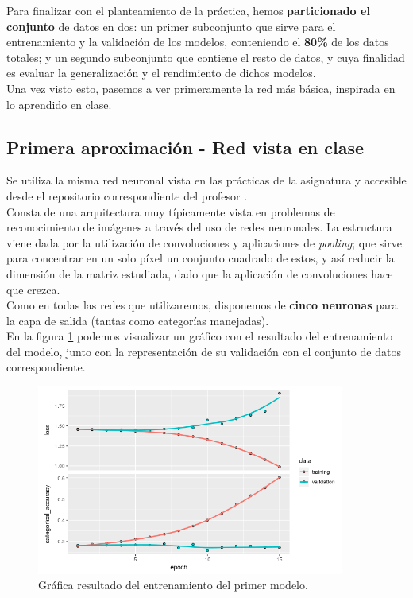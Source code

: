 \documentclass[]{article}
\begin{document}
	Para finalizar con el planteamiento de la práctica, hemos \textbf{particionado el conjunto} de datos en dos: un primer subconjunto que sirve para el entrenamiento y la validación de los modelos, conteniendo el \textbf{80\%} de los datos totales; y un segundo subconjunto que contiene el resto de datos, y cuya finalidad es evaluar la generalización y el rendimiento de dichos modelos.\\ 
	
	Una vez visto esto, pasemos a ver primeramente la red más básica, inspirada en lo aprendido en clase.

	\subsection{Primera aproximación - Red vista en clase}
	
		Se utiliza la misma red neuronal vista en las prácticas de la asignatura y accesible desde el repositorio correspondiente del profesor \cite{red-clase}.\\
	
		Consta de una arquitectura muy típicamente vista en problemas de reconocimiento de imágenes a través del uso de redes neuronales. La estructura viene dada por la utilización de convoluciones y aplicaciones de \textit{pooling}; que sirve para concentrar en un solo píxel un conjunto cuadrado de estos, y así reducir la dimensión de la matriz estudiada, dado que la aplicación de convoluciones hace que crezca.\\
		
		Como en todas las redes que utilizaremos, disponemos de \textbf{cinco neuronas} para la capa de salida (tantas como categorías manejadas).\\
		
		En la figura \ref{first-nn} podemos visualizar un gráfico con el resultado del entrenamiento del modelo, junto con la representación de su validación con el conjunto de datos correspondiente.\\
	
		\begin{figure}[h]
			\centering
			\includegraphics[width=0.9\textwidth]{./img/model1}
			\caption{Gráfica resultado del entrenamiento del primer modelo.}
			\label{first-nn}
		\end{figure}
	
\end{document}

